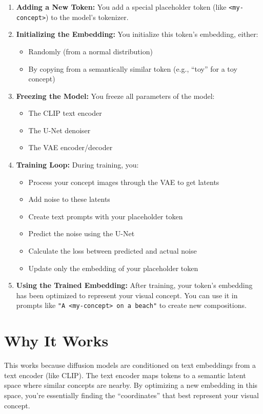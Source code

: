 \begin{enumerate}
  \item \textbf{Adding a New Token:} You add a special placeholder token (like \texttt{<my-concept>}) to the model's tokenizer.

  \item \textbf{Initializing the Embedding:} You initialize this token’s embedding, either:
    \begin{itemize}
      \item Randomly (from a normal distribution)
      \item By copying from a semantically similar token (e.g., ``toy'' for a toy concept)
    \end{itemize}

  \item \textbf{Freezing the Model:} You freeze all parameters of the model:
    \begin{itemize}
      \item The CLIP text encoder
      \item The U-Net denoiser
      \item The VAE encoder/decoder
    \end{itemize}

  \item \textbf{Training Loop:} During training, you:
    \begin{itemize}
      \item Process your concept images through the VAE to get latents
      \item Add noise to these latents
      \item Create text prompts with your placeholder token
      \item Predict the noise using the U-Net
      \item Calculate the loss between predicted and actual noise
      \item Update only the embedding of your placeholder token
    \end{itemize}

  \item \textbf{Using the Trained Embedding:} After training, your token’s embedding has been optimized to represent your visual concept. You can use it in prompts like \texttt{"A <my-concept> on a beach"} to create new compositions.
\end{enumerate}
\section*{Why It Works}
This works because diffusion models are conditioned on text embeddings from a text encoder (like CLIP). The text encoder maps tokens to a semantic latent space where similar concepts are nearby. By optimizing a new embedding in this space, you're essentially finding the ``coordinates'' that best represent your visual concept.

